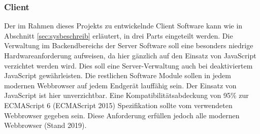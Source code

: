 \subsubsection{Client}\label{sec:clienttech}
Der im Rahmen dieses Projekts zu entwickelnde Client Software kann wie in Abschnitt \ref{sec:sysbeschreib} erläutert, in drei Parts eingeteilt werden. Die Verwaltung im Backendbereichs der Server Software soll eine besonders niedrige Hardwareanforderung aufweisen, da hier gänzlich auf den Einsatz von JavaScript verzichtet werden wird. Dies soll eine Server-Verwaltung auch bei deaktiviertem JavaScript gewährleisten. Die restlichen Software Module sollen in jedem modernen Webbrowser auf jedem Endgerät lauffähig sein. Der Einsatz von JavaScript ist hier unverzichtbar. Eine Kompatibilitätsabdeckung von 95\% zur ECMAScript 6 (ECMAScript 2015) Spezifikation sollte vom verwendeten Webbrowser gegeben sein. Diese Anforderung erfüllen jedoch alle modernen Webbrowser (Stand 2019)\cite{ECMAScri7:online}. 
